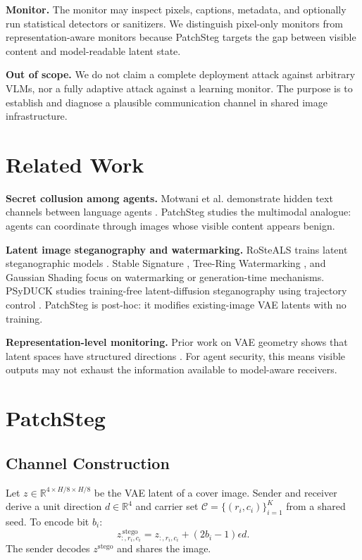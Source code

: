 \documentclass{article}
\begin{document}
\textbf{Monitor.}
The monitor may inspect pixels, captions, metadata, and optionally run statistical detectors or sanitizers. We distinguish pixel-only monitors from representation-aware monitors because PatchSteg targets the gap between visible content and model-readable latent state.

\textbf{Out of scope.}
We do not claim a complete deployment attack against arbitrary VLMs, nor a fully adaptive attack against a learning monitor. The purpose is to establish and diagnose a plausible communication channel in shared image infrastructure.

\section{Related Work}

\textbf{Secret collusion among agents.}
Motwani et al. demonstrate hidden text channels between language agents \citep{motwani2024secret}. PatchSteg studies the multimodal analogue: agents can coordinate through images whose visible content appears benign.

\textbf{Latent image steganography and watermarking.}
RoSteALS trains latent steganographic models \citep{bui2023rosteals}. Stable Signature \citep{fernandez2023stable}, Tree-Ring Watermarking \citep{wen2023treering}, and Gaussian Shading \citep{yang2024gaussian} focus on watermarking or generation-time mechanisms. PSyDUCK studies training-free latent-diffusion steganography using trajectory control \citep{jiang2025psyduck}. PatchSteg is post-hoc: it modifies existing-image VAE latents with no training.

\textbf{Representation-level monitoring.}
Prior work on VAE geometry shows that latent spaces have structured directions \citep{rolinek2019variational}. For agent security, this means visible outputs may not exhaust the information available to model-aware receivers.

\section{PatchSteg}

\subsection{Channel Construction}

Let $z\in\mathbb{R}^{4\times H/8\times H/8}$ be the VAE latent of a cover image. Sender and receiver derive a unit direction $d\in\mathbb{R}^4$ and carrier set $\mathcal{C}=\{(r_i,c_i)\}_{i=1}^K$ from a shared seed. To encode bit $b_i$:
\begin{equation}
z_{:,r_i,c_i}^{\,\mathrm{stego}}=z_{:,r_i,c_i}+(2b_i-1)\epsilon d .
\end{equation}
The sender decodes $z^{\mathrm{stego}}$ and shares the image.
\end{document}
